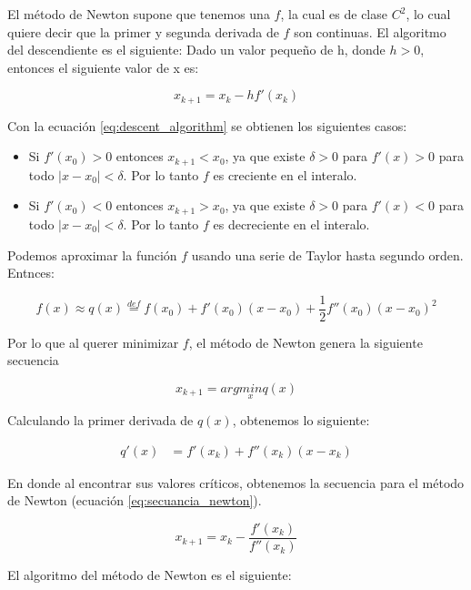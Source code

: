 El método de Newton supone que tenemos una $f$, la cual es de clase $C^2$, lo cual quiere decir que la primer y segunda derivada de $f$ son continuas. El algoritmo del descendiente es el siguiente:
Dado un valor pequeño de h, donde $h>0$, entonces el siguiente valor de x es:

\begin{equation}
    x_{k+1} = x_k -hf'(x_k)
    \label{eq:descent_algorithm}
\end{equation}

Con la ecuación \ref{eq:descent_algorithm} se obtienen los siguientes casos:
\begin{itemize}
    \item Si $f'(x_0)>0$ entonces $x_{k+1}<x_0$, ya que existe $\delta>0$ para $f'(x)>0$ para todo $|x-x_0|<\delta$. Por lo tanto $f$ es creciente en el interalo.
    \item Si $f'(x_0)<0$ entonces $x_{k+1}>x_0$, ya que existe $\delta>0$ para $f'(x)<0$ para todo $|x-x_0|<\delta$. Por lo tanto $f$ es decreciente en el interalo.
\end{itemize}

Podemos aproximar la función $f$ usando una serie de Taylor hasta segundo orden. Entnces:

\begin{equation*}
    f(x) \approx q(x) \overset{def}{=} f(x_0)+ f'(x_0)(x-x_0) + \frac{1}{2} f''(x_0)(x-x_0)^2
\end{equation*}

Por lo que al querer minimizar $f$, el método de Newton genera la siguiente secuencia

\begin{equation*}
    x_{k+1} = arg \underset{x}{min} q(x)
\end{equation*}

Calculando la primer derivada de $q(x)$, obtenemos lo siguiente:

\begin{align*}
    q'(x) & = f'(x_k)+ f''(x_k) (x-x_k)
\end{align*}

En donde al encontrar sus valores críticos, obtenemos la secuencia para el método de Newton (ecuación \ref{eq:secuancia_newton}).

\begin{equation}
    x_{k+1} = x_k - \frac{f'(x_k)}{f''(x_k)}
    \label{eq:secuancia_newton}
\end{equation}

El algoritmo del método de Newton es el siguiente:

